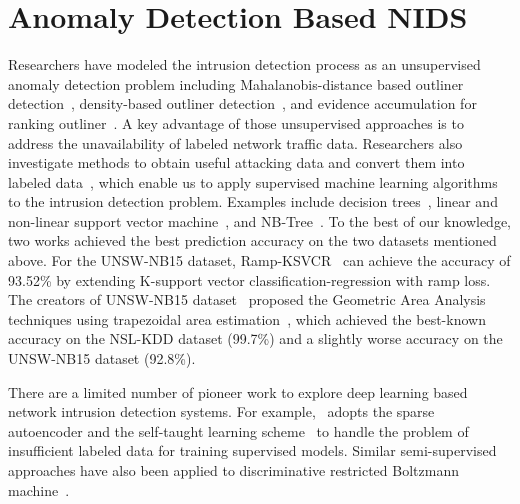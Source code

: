 \section{Anomaly Detection Based NIDS}
\label{CompareDL:Sec:RelatedWorks}

Researchers have modeled the intrusion detection process as an unsupervised
anomaly detection problem including Mahalanobis-distance based outliner detection~\cite{ComparativeAnomalyNIDS},
density-based outliner detection~\cite{LOF}, and evidence accumulation for ranking outliner~\cite{RankingOutliner}.
A key advantage of those unsupervised approaches is to address the unavailability of labeled network traffic data.
Researchers also investigate methods to obtain useful attacking data and convert them into labeled data~\cite{KDDCup, NSL-KDD, UNSW},
which enable us to apply supervised machine learning algorithms to the intrusion detection problem.
Examples include decision trees~\cite{DecisionTree}, linear and non-linear support vector machine~\cite{SVM},
and NB-Tree~\cite{NB-Tree}. To the best of our knowledge, two works achieved the best prediction accuracy on the two datasets mentioned above.
For the UNSW-NB15 dataset, Ramp-KSVCR~\cite{RampLossKSVCR} can achieve the accuracy of 93.52\% by extending K-support vector classification-regression with ramp loss. 
The creators of UNSW-NB15 dataset~\cite{UNSW} proposed the Geometric Area Analysis techniques using trapezoidal area estimation~\cite{GAA-ADS},
which achieved the best-known accuracy on the NSL-KDD dataset (99.7\%) and
a slightly worse accuracy on the UNSW-NB15 dataset (92.8\%).

There are a limited number of pioneer work to explore deep learning based network intrusion detection systems.
For example,~\cite{STL-NIDS} adopts the sparse autoencoder and the self-taught learning scheme~\cite{SparseAE}
to handle the problem of insufficient labeled data for training supervised models.
Similar semi-supervised approaches have also been applied to discriminative restricted Boltzmann machine~\cite{AnomalyDetectionRBM}.

